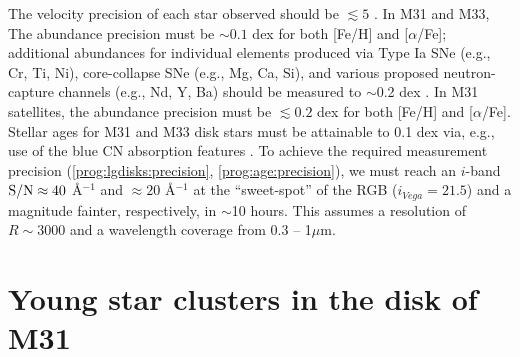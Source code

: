 \documentclass[11pt,a4paper,twoside,onecolumn,openany,final,oldfontcommands]{memoir}
\def\NS#1{\noindent{\textcolor{lblue}{\textbf[NS: #1]}}}
\begin{document}
\begin{sciencerequirement}
\reqitem The velocity precision of each star observed should be $\lesssim 5$ \kms \NS{Do M31 satellite stars require a different precision?}.
\reqitem In M31 and M33, The abundance precision must be $\sim 0.1$ dex for both [Fe/H] and [$\alpha$/Fe]; additional abundances for individual elements produced via Type Ia SNe (e.g., Cr, Ti, Ni), core-collapse SNe (e.g., Mg, Ca, Si), and various proposed neutron-capture channels (e.g., Nd, Y, Ba) should be measured to $\sim$0.2 dex \citep[Fig.~\ref{fig:abundances_snr}; cf.][]{Sandford20}. \label{prog:lgdisks:precision}
\reqitem In M31 satellites, the abundance precision must be $\lesssim 0.2$ dex for both [Fe/H] and [$\alpha$/Fe].
\reqitem Stellar ages for M31 and M33 disk stars must be attainable to 0.1 dex via, e.g., use of the blue CN absorption features \citep[e.g.][]{Martig16,Ting19}.  %
\label{prog:age:precision}
\reqitem To achieve the required measurement precision (\ref{prog:lgdisks:precision}, \ref{prog:age:precision}), we must reach an $i$-band ${\rm S/N} \approx 40$ \AA$^{-1}$ and $\approx 20$ \AA$^{-1}$ at the  ``sweet-spot'' of the RGB ($i_{Vega} = 21.5$) and a magnitude fainter, respectively, in $\sim$10 hours.  This assumes a resolution of $R\sim3000$ and a wavelength coverage from 0.3 -- 1$\mu$m.
\end{sciencerequirement}

\section{Young star clusters in the disk of M31}
\end{document}
